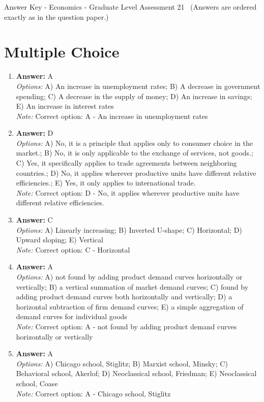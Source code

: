 \documentclass[12pt]{article}
\begin{document}
\begin{center}
Answer Key - Economics - Graduate Level Assessment 21 \
\small (Answers are ordered exactly as in the question paper.)
\end{center}

\section*{Multiple Choice}
\begin{enumerate}[label=\arabic*.]
\item \textbf{Answer:} A
\\ \textit{Options:} A) An increase in unemployment rates; B) A decrease in government spending; C) A decrease in the supply of money; D) An increase in savings; E) An increase in interest rates
\\ \textit{Note:} Correct option: A - An increase in unemployment rates
\item \textbf{Answer:} D
\\ \textit{Options:} A) No, it is a principle that applies only to consumer choice in the market.; B) No, it is only applicable to the exchange of services, not goods.; C) Yes, it specifically applies to trade agreements between neighboring countries.; D) No, it applies wherever productive units have different relative efficiencies.; E) Yes, it only applies to international trade.
\\ \textit{Note:} Correct option: D - No, it applies wherever productive units have different relative efficiencies.
\item \textbf{Answer:} C
\\ \textit{Options:} A) Linearly increasing; B) Inverted U-shape; C) Horizontal; D) Upward sloping; E) Vertical
\\ \textit{Note:} Correct option: C - Horizontal
\item \textbf{Answer:} A
\\ \textit{Options:} A) not found by adding product demand curves horizontally or vertically; B) a vertical summation of market demand curves; C) found by adding product demand curves both horizontally and vertically; D) a horizontal subtraction of firm demand curves; E) a simple aggregation of demand curves for individual goods
\\ \textit{Note:} Correct option: A - not found by adding product demand curves horizontally or vertically
\item \textbf{Answer:} A
\\ \textit{Options:} A) Chicago school, Stiglitz; B) Marxist school, Minsky; C) Behavioral school, Akerlof; D) Neoclassical school, Friedman; E) Neoclassical school, Coase
\\ \textit{Note:} Correct option: A - Chicago school, Stiglitz
\end{enumerate}
\end{document}
